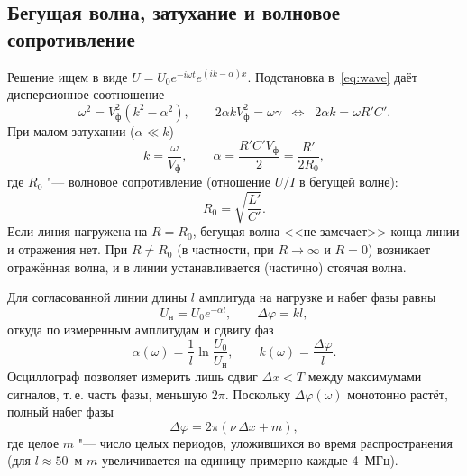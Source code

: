 \documentclass[a4paper,12pt]{article}
\begin{document}
\subsection{Бегущая волна, затухание и волновое сопротивление}
Решение ищем в виде $U = U_0 e^{-i\omega t}e^{(ik-\alpha)x}$. Подстановка
в~\eqref{eq:wave} даёт дисперсионное соотношение
\begin{equation}
    \label{eq:dispersion}
    \omega^2 = V_\text{ф}^2\left(k^2-\alpha^2\right),
    \qquad
    2\alpha k V_\text{ф}^2 = \omega\gamma
    \;\;\Longleftrightarrow\;\;
    2\alpha k = \omega R'C'.
\end{equation}
При малом затухании ($\alpha\ll k$)
\begin{equation}
    \label{eq:alpha_k}
    k = \frac{\omega}{V_\text{ф}},
    \qquad
    \alpha = \frac{R'C'V_\text{ф}}{2} = \frac{R'}{2R_0},
\end{equation}
где $R_0$ "--- волновое сопротивление (отношение $U/I$ в бегущей волне):
\begin{equation}
    \label{eq:R0}
    R_0 = \sqrt{\frac{L'}{C'}}.
\end{equation}
Если линия нагружена на $R = R_0$, бегущая волна <<не замечает>> конца
линии и отражения нет. При $R\ne R_0$ (в частности, при $R\to\infty$ и
$R = 0$) возникает отражённая волна, и в линии устанавливается
(частично) стоячая волна.

Для согласованной линии длины $l$ амплитуда на нагрузке и набег фазы равны
\begin{equation}
    \label{eq:Un_dphi}
    U_\text{н} = U_0 e^{-\alpha l},
    \qquad
    \Delta\varphi = kl,
\end{equation}
откуда по измеренным амплитудам и сдвигу фаз
\begin{equation}
    \label{eq:alpha_k_exp}
    \alpha(\omega) = \frac{1}{l}\ln\frac{U_0}{U_\text{н}},
    \qquad
    k(\omega) = \frac{\Delta\varphi}{l}.
\end{equation}
Осциллограф позволяет измерить лишь сдвиг $\Delta x < T$ между
максимумами сигналов, т.\,е. часть фазы, меньшую $2\pi$. Поскольку
$\Delta\varphi(\omega)$ монотонно растёт, полный набег фазы
\begin{equation}
    \label{eq:phase_unwrap}
    \Delta\varphi = 2\pi\left(\nu\,\Delta x + m\right),
\end{equation}
где целое $m$ "--- число целых периодов, уложившихся во время
распространения (для $l\approx50$~м $m$ увеличивается на единицу примерно
каждые 4~МГц).
\end{document}
